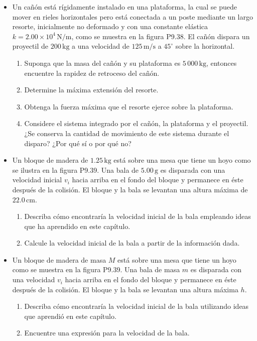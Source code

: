 \documentclass[11pt,a4paper]{article}
\begin{document}
\newpage

\begin{itemize}
    \item[\textbf{38.}] Un cañón está rígidamente instalado en una plataforma, la cual se puede mover en rieles horizontales pero está conectada a un poste mediante un largo resorte, inicialmente no deformado y con una constante elástica \(k = 2.00 \times 10^4\,\text{N/m}\), como se muestra en la figura P9.38. El cañón dispara un proyectil de \(200\,\text{kg}\) a una velocidad de \(125\,\text{m/s}\) a \(45^\circ\) sobre la horizontal.
    \begin{enumerate}
        \item Suponga que la masa del cañón y su plataforma es \(5\,000\,\text{kg}\), entonces encuentre la rapidez de retroceso del cañón.
        \item Determine la máxima extensión del resorte.
        \item Obtenga la fuerza máxima que el resorte ejerce sobre la plataforma.
        \item Considere el sistema integrado por el cañón, la plataforma y el proyectil. ¿Se conserva la cantidad de movimiento de este sistema durante el disparo? ¿Por qué sí o por qué no?
    \end{enumerate}
    \vspace*{8cm}

    \item[\textbf{39.}] Un bloque de madera de \(1.25\,\text{kg}\) está sobre una mesa que tiene un hoyo como se ilustra en la figura P9.39. Una bala de \(5.00\,\text{g}\) es disparada con una velocidad inicial \(v_i\) hacia arriba en el fondo del bloque y permanece en éste después de la colisión. El bloque y la bala se levantan una altura máxima de \(22.0\,\text{cm}\).
    \begin{enumerate}
        \item Describa cómo encontraría la velocidad inicial de la bala empleando ideas que ha aprendido en este capítulo.
        \item Calcule la velocidad inicial de la bala a partir de la información dada.
    \end{enumerate}
    \vspace*{6cm}

    \item[\textbf{40.}] Un bloque de madera de masa \(M\) está sobre una mesa que tiene un hoyo como se muestra en la figura P9.39. Una bala de masa \(m\) es disparada con una velocidad \(v_i\) hacia arriba en el fondo del bloque y permanece en éste después de la colisión. El bloque y la bala se levantan una altura máxima \(h\).
    \begin{enumerate}
        \item Describa cómo encontraría la velocidad inicial de la bala utilizando ideas que aprendió en este capítulo.
        \item Encuentre una expresión para la velocidad de la bala.
    \end{enumerate}
    \vspace*{6cm}
\end{itemize}
\end{document}
